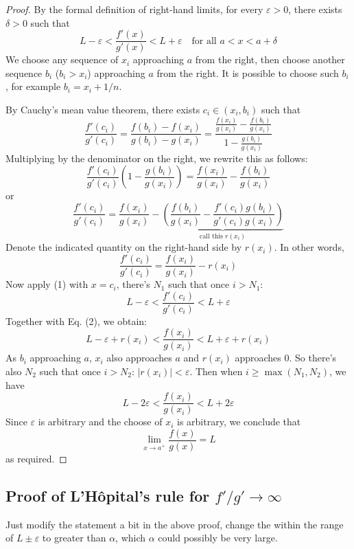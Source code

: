 \documentclass{article}
\begin{document}
\begin{proof}
    By the formal definition of right-hand limits,
    for every \( \varepsilon > 0 \), there exists \( \delta > 0 \) such that
    \[
        L - \varepsilon < \frac{f'(x)}{g'(x)} < L + \varepsilon \quad \text{for all } a < x < a + \delta\tag*{(1)}
    \]
    We choose any sequence of $x_i$ approaching $a$ from the right, then choose another sequence
    $b_i$ ($b_i>x_i$) approaching $a$ from the right. It is possible to choose such $b_i$, for example
    $b_i=x_i+1/n$.

    By Cauchy's mean value theorem, there exists \( c_i \in (x_i, b_i) \) such that
    \[
        \frac{f'(c_i)}{g'(c_i)} = \frac{f(b_i) - f(x_i)}{g(b_i) - g(x_i)}
        = \frac{\frac{f(x_i)}{g(x_i)} - \frac{f(b_i)}{g(x_i)}}{1 - \frac{g(b_i)}{g(x_i)}}
    \]
    Multiplying by the denominator on the right, we rewrite this as follows:
    \[
        \frac{f'(c_i)}{g'(c_i)} \left( 1 - \frac{g(b_i)}{g(x_i)} \right) = \frac{f(x_i)}{g(x_i)} - \frac{f(b_i)}{g(x_i)}
    \]
    or
    \[
        \frac{f'(c_i)}{g'(c_i)} = \frac{f(x_i)}{g(x_i)} -
        \underbrace{\left( \frac{f(b_i)}{g(x_i)} - \frac{f'(c_i)g(b_i)}{g'(c_i)g(x_i)} \right)}_{\text{call this } r(x_i)}
    \]
    Denote the indicated quantity on the right-hand side by \( r(x_i) \). In other words,
    \[
        \frac{f'(c_i)}{g'(c_i)} = \frac{f(x_i)}{g(x_i)} - r(x_i) \tag*{(2)}
    \]
    Now apply (1) with \( x = c_i \), there's $N_1$ such that once \( i > N_1 \):
    \[
        L - \varepsilon < \frac{f'(c_i)}{g'(c_i)} < L + \varepsilon
    \]
    Together with Eq. (2), we obtain:
    \[
        L - \varepsilon + r(x_i) < \frac{f(x_i)}{g(x_i)} < L + \varepsilon + r(x_i)
    \]
    As $b_i$ approaching $a$, $x_i$ also approaches $a$ and $r(x_i)$ approaches $0$.
    So there's also $N_2$ such that once \( i > N_2 \):
    \(
    |r(x_i)| < \varepsilon
    \).
    Then when $i\ge\max(N_1,N_2)$, we have
    \[
        L - 2\varepsilon < \frac{f(x_i)}{g(x_i)} < L + 2\varepsilon
    \]
    Since $\varepsilon$ is arbitrary and the choose of $x_i$ is arbitrary, we conclude that
    \[
        \lim_{x \to a^+} \frac{f(x)}{g(x)} = L
    \]
    as required.
\end{proof}

\subsection{Proof of L'H\^opital's rule for $f'/g'\to\infty$}
Just modify the statement a bit in the above proof,
change the within the range of $L\pm\varepsilon$
to greater than $\alpha$, which $\alpha$ could possibly be very large.
\end{document}
